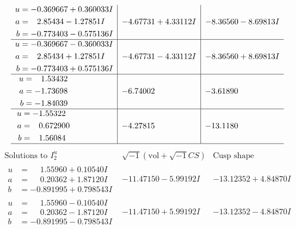 \documentclass[1p]{elsarticle_modified}
\theoremstyle{definition}
\newcommand{\I}{\sqrt{-1}}
\begin{document}
$$\begin{array}{c|c|c}
\begin{aligned}
u &= -0.369667 + 0.360033 I \\
a &= \phantom{-}2.85434 - 1.27851 I \\
b &= -0.773403 - 0.575136 I\end{aligned}
 & -4.67731 + 4.33112 I & -8.36560 - 8.69813 I \\ \hline\begin{aligned}
u &= -0.369667 - 0.360033 I \\
a &= \phantom{-}2.85434 + 1.27851 I \\
b &= -0.773403 + 0.575136 I\end{aligned}
 & -4.67731 - 4.33112 I & -8.36560 + 8.69813 I \\ \hline\begin{aligned}
u &= \phantom{-}1.53432\phantom{ +0.000000I} \\
a &= -1.73698\phantom{ +0.000000I} \\
b &= -1.84039\phantom{ +0.000000I}\end{aligned}
 & -6.74002\phantom{ +0.000000I} & -3.61890\phantom{ +0.000000I} \\ \hline\begin{aligned}
u &= -1.55322\phantom{ +0.000000I} \\
a &= \phantom{-}0.672900\phantom{ +0.000000I} \\
b &= \phantom{-}1.56084\phantom{ +0.000000I}\end{aligned}
 & -4.27815\phantom{ +0.000000I} & -13.1180\phantom{ +0.000000I}\\
 \hline 
 \end{array}$$\newpage$$\begin{array}{c|c|c}  
\text{Solutions to }I^u_{2}& \I (\text{vol} + \sqrt{-1}CS) & \text{Cusp shape}\\
 \hline 
\begin{aligned}
u &= \phantom{-}1.55960 + 0.10540 I \\
a &= \phantom{-}0.20362 + 1.87120 I \\
b &= -0.891995 + 0.798543 I\end{aligned}
 & -11.47150 - 5.99192 I & -13.12352 + 4.84870 I \\ \hline\begin{aligned}
u &= \phantom{-}1.55960 - 0.10540 I \\
a &= \phantom{-}0.20362 - 1.87120 I \\
b &= -0.891995 - 0.798543 I\end{aligned}
 & -11.47150 + 5.99192 I & -13.12352 - 4.84870 I \\ \hline\begin{aligned}

\end{aligned}
\end{array}$$
\end{document}
